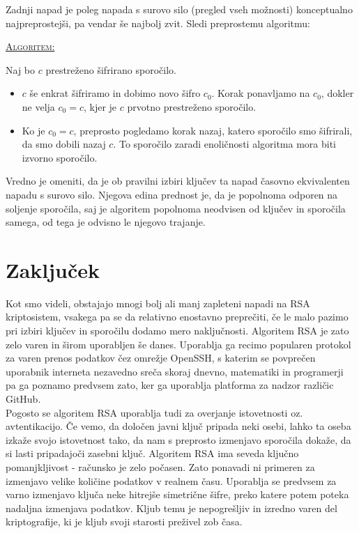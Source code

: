 \documentclass[a4paper, 12pt]{article} %
\newenvironment{matematika}[1]{
\textcolor{bostonuniversityred}{\underline{\textsc{#1:}}}
}{
}
\begin{document}
Zadnji napad je poleg napada s surovo silo (pregled vseh možnosti) konceptualno najpreprostejši, pa vendar še najbolj zvit. Sledi preprostemu algoritmu:

\begin{matematika}{Algoritem}
Naj bo $c$ prestreženo šifrirano sporočilo.
\begin{itemize}[label=]
\item $c$ še enkrat šifriramo in dobimo novo šifro $c_0$. Korak ponavljamo na $c_0$, dokler ne velja $c_0 = c$, kjer je $c$ prvotno prestreženo sporočilo.
\item Ko je $c_0 = c$, preprosto pogledamo korak nazaj, katero sporočilo smo šifrirali, da smo dobili nazaj $c$. To sporočilo zaradi enoličnosti algoritma mora biti izvorno sporočilo. \\
\end{itemize}
\end{matematika}

Vredno je omeniti, da je ob pravilni izbiri ključev ta napad časovno ekvivalenten napadu s surovo silo. Njegova edina prednost je, da je popolnoma odporen na soljenje sporočila, saj je algoritem popolnoma neodvisen od ključev in sporočila samega, od tega je odvisno le njegovo trajanje.

\newpage
\section{Zaključek}

Kot smo videli, obstajajo mnogi bolj ali manj zapleteni napadi na RSA kriptosistem, vsakega pa se da relativno enostavno preprečiti, če le malo pazimo pri izbiri ključev in sporočilu dodamo mero naključnosti. Algoritem RSA je zato zelo varen in širom uporabljen še danes. Uporablja ga recimo popularen protokol za varen prenos podatkov čez omrežje OpenSSH, s katerim se povprečen uporabnik interneta nezavedno sreča skoraj dnevno, matematiki in programerji pa ga poznamo predvsem zato, ker ga uporablja platforma za nadzor različic GitHub.\\
Pogosto se algoritem RSA uporablja tudi za overjanje istovetnosti oz. avtentikacijo. Če vemo, da določen javni ključ pripada neki osebi, lahko ta oseba izkaže svojo istovetnost tako, da nam s preprosto izmenjavo sporočila dokaže, da si lasti pripadajoči zasebni ključ.
\newline
\newline
Algoritem RSA ima seveda ključno pomanjkljivost - računsko je zelo počasen. Zato ponavadi ni primeren za izmenjavo velike količine podatkov v realnem času. Uporablja se predvsem za varno izmenjavo ključa neke hitrejše simetrične šifre, preko katere potem poteka nadaljna izmenjava podatkov. Kljub temu je nepogrešljiv in izredno varen del kriptografije, ki je kljub svoji starosti preživel zob časa.
\end{document}
